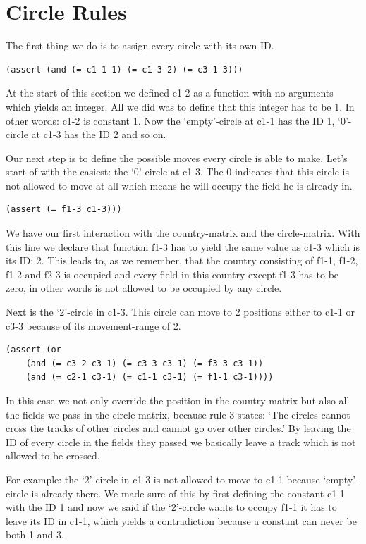 \section{Circle Rules}
The first thing we do is to assign every circle with its own ID.
\begin{lstlisting}
(assert (and (= c1-1 1) (= c1-3 2) (= c3-1 3)))
\end{lstlisting}
At the start of this section we defined c1-2 as a function with no arguments which yields an integer. All we did was to define that this integer has to be 1. In other words: c1-2 is constant 1.
Now the `empty'-circle at c1-1 has the ID 1, `0'-circle at c1-3 has the ID 2 and so on.

Our next step is to define the possible moves every circle is able to make. Let's start of with the easiest: the `0'-circle at c1-3. The 0 indicates that this circle is not allowed to move at all which means he will occupy the field he is already in.
\begin{lstlisting}
(assert (= f1-3 c1-3)))
\end{lstlisting}
We have our first interaction with the country-matrix and the circle-matrix. With this line we declare that function f1-3 has to yield the same value as c1-3 which is its ID: 2. This leads to, as we remember, that the country consisting of f1-1, f1-2, f1-2 and f2-3 is occupied and every field in this country except f1-3 has to be zero, in other words is not allowed to be occupied by any circle.

Next is the `2'-circle in c1-3. This circle can move to 2 positions either to c1-1 or c3-3 because of its movement-range of 2.
\begin{lstlisting}
(assert (or 
	(and (= c3-2 c3-1) (= c3-3 c3-1) (= f3-3 c3-1)) 
	(and (= c2-1 c3-1) (= c1-1 c3-1) (= f1-1 c3-1))))
\end{lstlisting}
In this case we not only override the position in the country-matrix but also all the fields we pass in the circle-matrix, because rule 3 states: `The circles cannot cross the tracks of other circles and cannot go over other circles.' By leaving the ID of every circle in the fields they passed we basically leave a track which is not allowed to be crossed.

For example: the `2'-circle in c1-3 is not allowed to move to c1-1 because `empty'-circle is already there. We made sure of this by first defining the constant c1-1 with the ID 1 and now we said if the `2'-circle wants to occupy f1-1 it has to leave its ID in c1-1, which yields a contradiction because a constant can never be both 1 and 3.

